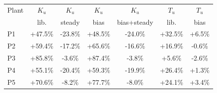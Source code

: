 \begin{tabular}{@{}lcccccc@{}}
\toprule
Plant & $K_u$ & $K_u$ & $K_u$ & $K_u$ & $T_u$ & $T_u$ \\
 & lib. & steady & bias & bias+steady & lib. & bias \\
\midrule
P1 & +47.5\% & -23.8\% & +48.5\% & -24.0\% & +32.5\% & +6.5\% \\
P2 & +59.4\% & -17.2\% & +65.6\% & -16.6\% & +16.9\% & -0.6\% \\
P3 & +85.8\% & -3.6\% & +87.4\% & -3.8\% & +5.6\% & -2.6\% \\
P4 & +55.1\% & -20.4\% & +59.3\% & -19.9\% & +26.4\% & +1.3\% \\
P5 & +70.6\% & -8.2\% & +77.7\% & -8.0\% & +24.1\% & +3.4\% \\
\bottomrule
\end{tabular}
